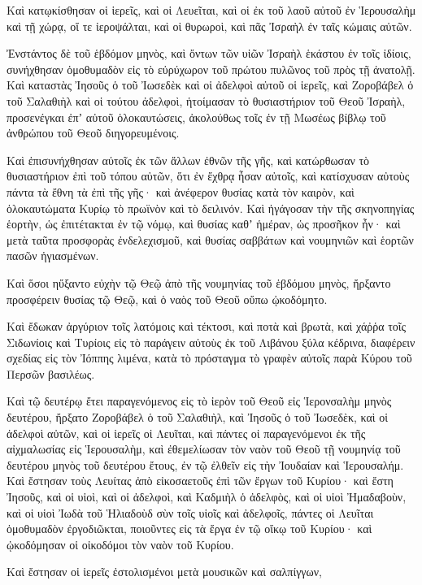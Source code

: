 {Καὶ κατῳκίσθησαν οἱ ἱερεῖς, καὶ οἱ Λευεῖται, καὶ οἱ ἐκ τοῦ λαοῦ αὐτοῦ ἐν Ἱερουσαλὴμ καὶ τῇ χώρᾳ, οἵ τε ἱεροψάλται, καὶ οἱ θυρωροὶ, καὶ πᾶς Ἰσραὴλ ἐν ταῖς κώμαις αὐτῶν.
\par }{\PP {}Ἐνστάντος δὲ τοῦ ἑβδόμον μηνὸς, καὶ ὄντων τῶν υἱῶν Ἰσραὴλ ἑκάστου ἐν τοῖς ἰδίοις, συνήχθησαν ὁμοθυμαδὸν εἰς τὸ εὐρύχωρον τοῦ πρώτου πυλῶνος τοῦ πρὸς τῇ ἀνατολῇ.
Καὶ καταστὰς Ἰησοῦς ὁ τοῦ Ἰωσεδὲκ καὶ οἱ ἀδελφοὶ αὐτοῦ οἱ ἱερεῖς, καὶ Ζοροβάβελ ὁ τοῦ Σαλαθιὴλ καὶ οἱ τούτου ἀδελφοὶ, ἡτοίμασαν τὸ θυσιαστήριον τοῦ Θεοῦ Ἰσραὴλ,
προσενέγκαι ἐπʼ αὐτοῦ ὁλοκαυτώσεις, ἀκολούθως τοῖς ἐν τῇ Μωσέως βίβλῳ τοῦ ἀνθρώπου τοῦ Θεοῦ διηγορευμένοις.
\par }{\PP {}Καὶ ἐπισυνήχθησαν αὐτοῖς ἐκ τῶν ἄλλων ἐθνῶν τῆς γῆς, καὶ κατώρθωσαν τὸ θυσιαστήριον ἐπὶ τοῦ τόπου αὐτῶν, ὅτι ἐν ἔχθρᾳ ἦσαν αὐτοῖς, καὶ κατίσχυσαν αὐτοὺς πάντα τὰ ἔθνη τὰ ἐπὶ τῆς γῆς· καὶ ἀνέφερον θυσίας κατὰ τὸν καιρὸν, καὶ ὁλοκαυτώματα Κυρίῳ τὸ πρωϊνὸν καὶ τὸ δειλινόν.
Καὶ ἠγάγοσαν τὴν τῆς σκηνοπηγίας ἑορτὴν, ὡς ἐπιτέτακται ἐν τῷ νόμῳ, καὶ θυσίας καθʼ ἡμέραν, ὡς προσῆκον ἦν·
καὶ μετὰ ταῦτα προσφορὰς ἐνδελεχισμοῦ, καὶ θυσίας σαββάτων καὶ νουμηνιῶν καὶ ἑορτῶν πασῶν ἡγιασμένων.
\par }{\PP {}Καὶ ὅσοι ηὔξαντο εὐχὴν τῷ Θεῷ ἀπὸ τῆς νουμηνίας τοῦ ἑβδόμου μηνὸς, ἤρξαντο προσφέρειν θυσίας τῷ Θεῷ, καὶ ὁ ναὸς τοῦ Θεοῦ οὔπω ᾠκοδόμητο.
\par }{\PP {}Καὶ ἔδωκαν ἀργύριον τοῖς λατόμοις καὶ τέκτοσι, καὶ ποτὰ καὶ βρωτὰ,
καὶ χάῤῥα τοῖς Σιδωνίοις καὶ Τυρίοις εἰς τὸ παράγειν αὐτοὺς ἐκ τοῦ Λιβάνου ξύλα κέδρινα, διαφέρειν σχεδίας εἰς τὸν Ἰόππης λιμένα, κατὰ τὸ πρόσταγμα τὸ γραφὲν αὐτοῖς παρὰ Κύρου τοῦ Περσῶν βασιλέως.
\par }{\PP {}Καὶ τῷ δευτέρῳ ἔτει παραγενόμενος εἰς τὸ ἰερὸν τοῦ Θεοῦ εἰς Ἱερονσαλὴμ μηνὸς δευτέρου, ἤρξατο Ζοροβάβελ ὁ τοῦ Σαλαθιὴλ, καὶ Ἰησοῦς ὁ τοῦ Ἰωσεδὲκ, καὶ οἱ ἀδελφοὶ αὐτῶν, καὶ οἱ ἱερεῖς οἱ Λευῖται, καὶ πάντες οἱ παραγενόμενοι ἐκ τῆς αἰχμαλωσίας εἰς Ἱερουσαλὴμ,
καὶ ἐθεμελίωσαν τὸν ναὸν τοῦ Θεοῦ τῇ νουμηνίᾳ τοῦ δευτέρου μηνὸς τοῦ δευτέρου ἔτους, ἐν τῷ ἐλθεῖν εἰς τὴν Ἰουδαίαν καὶ Ἱερουσαλήμ.
Καὶ ἔστησαν τοὺς Λευίτας ἀπὸ εἰκοσαετοῦς ἐπὶ τῶν ἔργων τοῦ Κυρίου· καὶ ἔστη Ἰησοῦς, καὶ οἱ υἱοὶ, καὶ οἱ ἀδελφοὶ, καὶ Καδμιὴλ ὁ ἀδελφὸς, καὶ οἱ υἱοὶ Ἠμαδαβοὺν, καὶ οἱ υἱοὶ Ἰωδὰ τοῦ Ἡλιαδοὺδ σὺν τοῖς υἱοῖς καὶ ἀδελφοῖς, πάντες οἱ Λευῖται ὁμοθυμαδὸν ἐργοδιῶκται, ποιοῦντες εἰς τὰ ἔργα ἐν τῷ οἴκῳ τοῦ Κυρίου· καὶ ᾠκοδόμησαν οἱ οἰκοδόμοι τὸν ναὸν τοῦ Κυρίου.
\par }{\PP {}Καὶ ἔστησαν οἱ ἱερεῖς ἐστολισμένοι μετὰ μουσικῶν καὶ σαλπίγγων,
}
